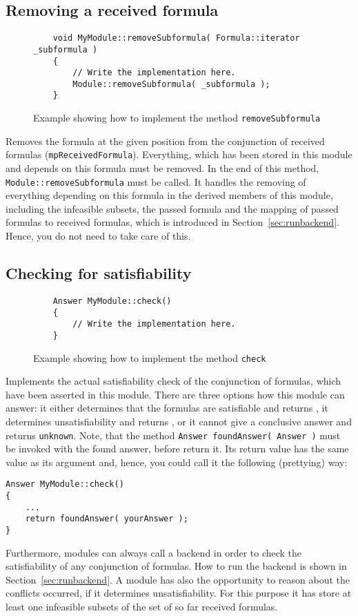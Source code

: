 \subsection{Removing a received formula}
\begin{figure}[htb]
\label{fig:exa_removesubformula}
\caption{Example showing how to implement the method \texttt{removeSubformula}}
\begin{verbatim}
	void MyModule::removeSubformula( Formula::iterator _subformula )
	{
	    // Write the implementation here.
	    Module::removeSubformula( _subformula );
	}
\end{verbatim}
\end{figure}
Removes the formula at the given position from the conjunction of received formulas
(\texttt{mpReceivedFormula}). Everything,
which has been stored in this module and depends on this formula must be removed. In the end of
this method, \texttt{Module::removeSubformula} must be called. It handles the removing of everything
depending on this formula in the derived members of this module, including the infeasible subsets,
the passed formula and the mapping of passed formulas to received formulas, which is introduced in
Section~\ref{sec:runbackend}. Hence, you do not need to take care of this.

\subsection{Checking for satisfiability}
\begin{figure}[htb]
\label{fig:exa_check}
\caption{Example showing how to implement the method \texttt{check}}
\begin{verbatim}
	Answer MyModule::check()
	{
	    // Write the implementation here.
	}
\end{verbatim}
\end{figure}
Implements the actual satisfiability check of the conjunction of formulas, which have been asserted in this module.
There are three options how this module can answer: it either determines that the formulas
are satisfiable and returns \true, it determines unsatisfiability and returns
\false, or it cannot give a conclusive answer and returns \texttt{unknown}. Note, that the method \texttt{Answer foundAnswer( Answer )} must
be invoked with the found answer, before return it. Its return value has the same value as its argument and, hence, you could call it the
following (prettying) way:
\begin{verbatim}
Answer MyModule::check()
{
    ...
    return foundAnswer( yourAnswer );
}
\end{verbatim}
Furthermore, modules can always call
a backend in order to check the satisfiability of any conjunction of formulas. How to run the backend is shown in
Section~\ref{sec:runbackend}. A module has also the opportunity to reason about the conflicts
occurred, if it determines unsatisfiability. For this purpose it has store at least one infeasible
subsets of the set of so far received formulas.

